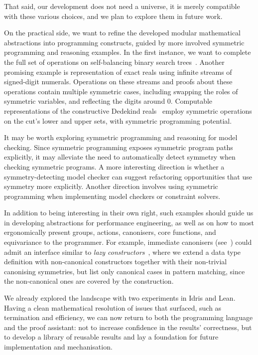 That said, our development does not need a universe, it is merely
compatible with these various choices, and we plan to explore them in
future work.

On the practical side, we want to refine the developed modular mathematical
abstractions into programming constructs,
guided by more involved symmetric programming and reasoning
examples. In the first instance, we want to complete the full set of
operations on self-balancing binary search
trees~\cite{mcbride:neighbours-in-order}.  Another promising example
is  representation of exact
reals using infinite streams of signed-digit numerals. Operations on
these streams and proofs about these operations contain multiple
symmetric cases, including swapping the roles of symmetric variables,
and reflecting the digits around $0$.  Computable representations of
the constructive Dedekind reals~\cite{kaucher:interval-analysis-in-the-extended-interval-space-IR,bauer-taylor:dedekind-reals-in-abstract-stone-duality,bauer:efficient-computation-with-dedekind-reals} employ symmetric operations on
the cut's lower and upper sets, with symmetric programming potential.

It may be worth exploring
symmetric programming and reasoning for model checking. Since
symmetric programming exposes symmetric program paths explicitly, it
may alleviate the need to automatically detect symmetry when checking
symmetric programs. A more interesting direction is whether a
symmetry-detecting model checker can suggest refactoring opportunities
that use symmetry more explicitly. Another direction involves using
symmetric programming when implementing model checkers or constraint
solvers.

In addition to being interesting in their own right, such examples should guide
us in developing abstractions for performance engineering, as well as on how to most
ergonomically present groups, actions, canonisers, core functions, and
equivariance to the programmer. For example, immediate canonisers
(see~) could admit an
interface similar to \emph{lazy
constructors}~\cite{DBLP:journals/pacmpl/LorenzenLSL25}, where we
extend a data type definition with non-canonical constructors together
with their non-trivial canonising symmetries, but list only canonical
cases in pattern matching, since the non-canonical ones are covered by
the \WLOG construction.

We already explored the landscape with two experiments
in Idris and Lean. Having a clean mathematical resolution
of issues that surfaced, such as termination and efficiency, we can
now return to both the programming language and the
proof assistant: not to increase confidence in the
results' correctness, but to develop a library of reusable
results and lay a foundation for future implementation and mechanisation.
